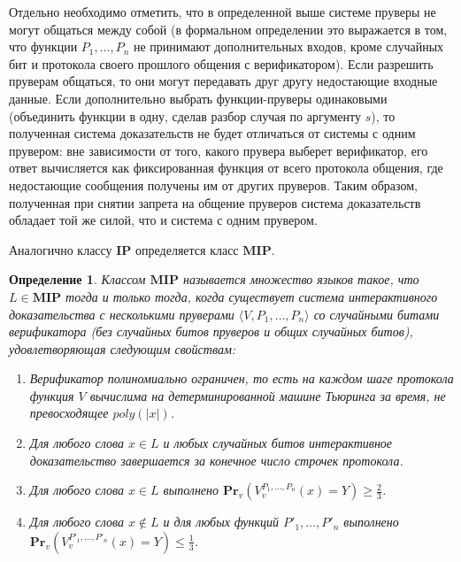 \documentclass[14pt, a4paper]{extreport}
\newtheorem{definition}{\indent Определение}
\newcommand{\poly}{\textit{poly}}
\newcommand{\pr}[2]{\textbf{Pr}_{#1}\left(#2\right)}
\begin{document}
Отдельно необходимо отметить, что в определенной выше системе пруверы не могут общаться между собой (в формальном определении это выражается в том, что функции $P_1, \dots, P_n$ не принимают дополнительных входов, кроме случайных бит и протокола своего прошлого общения с верификатором). Если разрешить пруверам общаться, то они могут передавать друг другу недостающие входные данные. Если дополнительно выбрать функции-пруверы одинаковыми (объединить функции в одну, сделав разбор случая по аргументу $s$), то полученная система доказательств не будет отличаться от системы с одним прувером: вне зависимости от того, какого прувера выберет верификатор, его ответ вычисляется как фиксированная функция от всего протокола общения, где недостающие сообщения получены им от других пруверов. Таким образом, полученная при снятии запрета на общение пруверов система доказательств обладает той же силой, что и система с одним прувером.

Аналогично классу $\textbf{IP}$ определяется класс $\textbf{MIP}$.

\begin{definition}\label{mip}
    Классом $\textbf{MIP}$ называется множество языков такое, что $L \in \textbf{MIP}$ тогда и только тогда, когда существует система интерактивного доказательства с несколькими пруверами $\langle V, P_1, \ldots, P_n\rangle$ со случайными битами верификатора (без случайных битов пруверов и общих случайных битов), удовлетворяющая следующим свойствам:
    \begin{enumerate}
        \item Верификатор полиномиально ограничен, то есть на каждом шаге протокола функция $V$ вычислима на детерминированной машине Тьюринга за время, не превосходящее $\poly(|x|)$.
        \item Для любого слова $x \in L$ и любых случайных битов интерактивное доказательство завершается за конечное число строчек протокола.
        \item Для любого слова $x \in L$ выполнено $\pr{v}{V^{P_1, \ldots, P_n}_{v}(x) = Y} \geqslant\frac{2}{3}$.
        \item Для любого слова $x \notin L$ и для любых функций $P'_1, \ldots, P'_n$ выполнено\\$\pr{v}{V^{P'_1, \ldots, P'_n}_{v}(x) = Y} \leqslant \frac{1}{3}$.
    \end{enumerate}
\end{definition}
\end{document}
